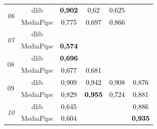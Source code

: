 \begin{table}[]
\begin{tabular}{c | c | c c c c}
\multirow{2}{*}{\textit{06}} & dlib & \cellcolor[HTML] {18E600}\textcolor{black}{\textbf{0,902}} & \cellcolor[HTML] {619E00}\textcolor{black}{0,62} & \cellcolor[HTML] {5FA000}\textcolor{black}{0,625} & \cellcolor[HTML] {807F00}\textcolor{white}{0,498} \\ & MediaPipe & \cellcolor[HTML] {38C600}\textcolor{black}{0,775} & \cellcolor[HTML] {4DB200}\textcolor{black}{0,697} & \cellcolor[HTML] {21DD00}\textcolor{black}{0,866} & \cellcolor[HTML] {7F8000}\textcolor{white}{0,5} \\ \hline
\multirow{2}{*}{\textit{07}} & dlib & \cellcolor[HTML] {A55900}\textcolor{white}{0,352} & \cellcolor[HTML] {A15E00}\textcolor{white}{0,368} & \cellcolor[HTML] {976800}\textcolor{white}{0,41} & \cellcolor[HTML] {A35C00}\textcolor{white}{0,363} \\ & MediaPipe & \cellcolor[HTML] {6C9300}\textcolor{black}{\textbf{0,574}} & \cellcolor[HTML] {AC5300}\textcolor{white}{0,325} & \cellcolor[HTML] {916E00}\textcolor{white}{0,431} & \cellcolor[HTML] {8C7300}\textcolor{white}{0,452} \\ \hline
\multirow{2}{*}{08} & dlib & \cellcolor[HTML] {4DB200}\textcolor{black}{\textbf{0,696}} & \cellcolor[HTML] {768900}\textcolor{white}{0,538} & \cellcolor[HTML] {E21D00}\textcolor{white}{0,115} & \cellcolor[HTML] {A95600}\textcolor{white}{0,337} \\ & MediaPipe & \cellcolor[HTML] {51AD00}\textcolor{black}{0,677} & \cellcolor[HTML] {51AE00}\textcolor{black}{0,681} & \cellcolor[HTML] {F50A00}\textcolor{white}{0,04} & \cellcolor[HTML] {728C00}\textcolor{white}{0,548} \\ \hline
\multirow{2}{*}{09} & dlib & \cellcolor[HTML] {17E800}\textcolor{black}{0,909} & \cellcolor[HTML] {0EF100}\textcolor{black}{0,942} & \cellcolor[HTML] {17E800}\textcolor{black}{0,908} & \cellcolor[HTML] {1FE000}\textcolor{black}{0,876} \\ & MediaPipe & \cellcolor[HTML] {2BD300}\textcolor{black}{0,829} & \cellcolor[HTML] {0BF300}\textcolor{black}{\textbf{0,955}} & \cellcolor[HTML] {46B900}\textcolor{black}{0,724} & \cellcolor[HTML] {1EE100}\textcolor{black}{0,881} \\ \hline
\multirow{2}{*}{\textit{10}} & dlib & \cellcolor[HTML] {59A500}\textcolor{black}{0,645} & \cellcolor[HTML] {837B00}\textcolor{white}{0,482} & \cellcolor[HTML] {936C00}\textcolor{white}{0,426} & \cellcolor[HTML] {1DE200}\textcolor{black}{0,886} \\ & MediaPipe & \cellcolor[HTML] {659A00}\textcolor{black}{0,604} & \cellcolor[HTML] {887700}\textcolor{white}{0,466} & \cellcolor[HTML] {817E00}\textcolor{white}{0,493} & \cellcolor[HTML] {10EF00}\textcolor{black}{\textbf{0,935}} \\ \hline

\end{tabular}
\end{table}
